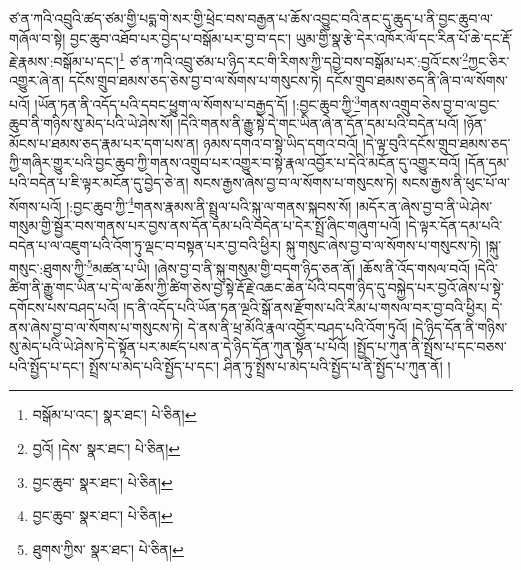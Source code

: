 ཙ་ན་ཀའི་འབྲུའི་ཚད་ཙམ་གྱི་པདྨ་གེ་སར་གྱི་ཕྲེང་བས་བརྒྱན་པ་ཆོས་འབྱུང་བའི་ནང་དུ་ཆུད་པ་ནི་བྱང་ཆུབ་ལ་གཞོལ་བ་སྟེ། བྱང་ཆུབ་འཐོབ་པར་བྱེད་པ་བསྒོམ་པར་བྱ་བ་དང་། ཡུམ་གྱི་སྣ་རྩེ་དེར་འཁོར་ལོ་དང་རིན་པོ་ཆེ་དང་རྡོ་རྗེ་རྣམས་:བསྒོམ་པ་དང་།\footnote{བསྒོམ་པ་འང་།  སྣར་ཐང་།  པེ་ཅིན། } ཙ་ན་ཀའི་འབྲུ་ཙམ་པ་ཉིད་རང་གི་རིགས་ཀྱི་དབྱེ་བས་བསྒོམ་པར་:བྱའོ་ངས་\footnote{བྱའོ། །དེས་  སྣར་ཐང་།  པེ་ཅིན། }ཀྱང་ཅིར་འགྱུར་ཞེ་ན། དངོས་གྲུབ་ཐམས་ཅད་ཅེས་བྱ་བ་ལ་སོགས་པ་གསུངས་ཏེ། དངོས་གྲུབ་ཐམས་ཅད་ནི་ཞི་བ་ལ་སོགས་པའོ། །ཡོན་ཏན་ནི་འདོད་པའི་དབང་ཕྱུག་ལ་སོགས་པ་བརྒྱད་དོ། །:བྱང་ཆུབ་ཀྱི་\footnote{བྱང་ཆུབ་  སྣར་ཐང་།  པེ་ཅིན། }གནས་འགྲུབ་ཅེས་བྱ་བ་ལ་བྱང་ཆུབ་ནི་གཉིས་སུ་མེད་པའི་ཡེ་ཤེས་སོ། །དེའི་གནས་ནི་རྒྱུ་སྟེ་དེ་གང་ཡིན་ཞེ་ན་དོན་དམ་པའི་བདེན་པའོ། །ཉོན་མོངས་པ་ཐམས་ཅད་རྣམ་པར་དག་པས་ན། ཉམས་དགའ་བ་སྟེ་ཡིད་དགའ་བའོ། །དེ་ལྟ་བུའི་དངོས་གྲུབ་ཐམས་ཅད་ཀྱི་གཞིར་གྱུར་པའི་བྱང་ཆུབ་ཀྱི་གནས་འགྲུབ་པར་འགྱུར་བ་སྟེ་རྣལ་འབྱོར་པ་དེའི་མངོན་དུ་འགྱུར་བའོ། །དོན་དམ་པའི་བདེན་པ་ཇི་ལྟར་མངོན་དུ་བྱེད་ཅེ་ན། སངས་རྒྱས་ཞེས་བྱ་བ་ལ་སོགས་པ་གསུངས་ཏེ། སངས་རྒྱས་ནི་ཕུང་པོ་ལ་སོགས་པའོ། །:བྱང་ཆུབ་ཀྱི་\footnote{བྱང་ཆུབ་  སྣར་ཐང་།  པེ་ཅིན། }གནས་རྣམས་ནི་སྤྲུལ་པའི་སྐུ་ལ་གནས་སྐབས་སོ། །མདོར་ན་ཞེས་བྱ་བ་ནི་ཡེ་ཤེས་གསུམ་གྱི་སྦྱོར་བས་གནས་པར་བྱས་ནས་དོན་དམ་པའི་བདེན་པ་དེར་སྤྲོ་ཞིང་གཞུག་པའོ། །དེ་ལྟར་དོན་དམ་པའི་བདེན་པ་ལ་འཇུག་པའི་འོག་ཏུ་ལྡང་བ་བསྟན་པར་བྱ་བའི་ཕྱིར། སྐུ་གསུང་ཞེས་བྱ་བ་ལ་སོགས་པ་གསུངས་ཏེ། །སྐུ་གསུང་:ཐུགས་ཀྱི་\footnote{ཐུགས་ཀྱིས་  སྣར་ཐང་།  པེ་ཅིན། }མཚན་པ་ཡི། །ཞེས་བྱ་བ་ནི་སྐུ་གསུམ་གྱི་བདག་ཉིད་ཅན་ནོ། །ཆོས་ནི་འོད་གསལ་བའོ། །དེའི་ཚིག་ནི་རྒྱུ་གང་ཡིན་པ་དེ་ལ་ཆོས་ཀྱི་ཚིག་ཅེས་བྱ་སྟེ་རྡོ་རྗེ་འཆང་ཆེན་པོའི་བདག་ཉིད་དུ་བསྐྱེད་པར་བྱའོ་ཞེས་པ་སྟེ་དགོངས་པས་བཤད་པའོ། །ད་ནི་འདོད་པའི་ཡོན་ཏན་ལྔའི་སྒོ་ནས་རྫོགས་པའི་རིམ་པ་གསལ་བར་བྱ་བའི་ཕྱིར། དེ་ནས་ཞེས་བྱ་བ་ལ་སོགས་པ་གསུངས་ཏེ། དེ་ནས་ནི་ཕྲ་མོའི་རྣལ་འབྱོར་བཤད་པའི་འོག་ཏུའོ། །དེ་ཉིད་དོན་ནི་གཉིས་སུ་མེད་པའི་ཡེ་ཤེས་ཏེ་དེ་སྟོན་པར་མཛད་པས་ན་དེ་ཉིད་དོན་ཀུན་སྟོན་པ་པོའོ། །སྤྱོད་པ་ཀུན་ནི་སྤྲོས་པ་དང་བཅས་པའི་སྤྱོད་པ་དང་། སྤྲོས་པ་མེད་པའི་སྤྱོད་པ་དང་། ཤིན་ཏུ་སྤྲོས་པ་མེད་པའི་སྤྱོད་པ་ནི་སྤྱོད་པ་ཀུན་ནོ། །
